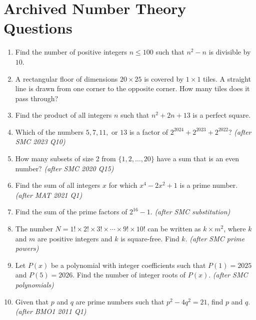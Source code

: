 \section*{Archived Number Theory Questions}
\begin{enumerate}

\item Find the number of positive integers $n \leq 100$ such that $n^2 - n$ is divisible by $10$.

\item A rectangular floor of dimensions $20 \times 25$ is covered by $1 \times 1$ tiles. A straight line is drawn from one corner to the opposite corner. How many tiles does it pass through?

\item Find the product of all integers $n$ such that $n^2 + 2n + 13$ is a perfect square.


\item Which of the numbers $5, 7, 11,$ or $13$ is a factor of $2^{2024} + 2^{2023} + 2^{2022}$? \textit{\small(after SMC 2023 Q10)}

\item How many subsets of size 2 from $\{1, 2, \dots, 20\}$ have a sum that is an even number? \textit{\small(after SMC 2020 Q15)}

\item Find the sum of all integers $x$ for which $x^4 - 2x^2 + 1$ is a prime number. \textit{\small(after MAT 2021 Q1)}


\item Find the sum of the prime factors of $2^{16} - 1$. \textit{\small(after SMC substitution)}

\item The number $N = 1! \times 2! \times 3! \times \cdots \times 9! \times 10!$ can be written as $k \times m^2$, where $k$ and $m$ are positive integers and $k$ is square-free. Find $k$. \textit{\small(after SMC prime powers)}

\item Let $P(x)$ be a polynomial with integer coefficients such that $P(1) = 2025$ and $P(5) = 2026$. Find the number of integer roots of $P(x)$. \textit{\small(after SMC polynomials)}


\item Given that $p$ and $q$ are prime numbers such that $p^2 - 4q^2 = 21$, find $p$ and $q$. \textit{\small(after BMO1 2011 Q1)}


\end{enumerate}
